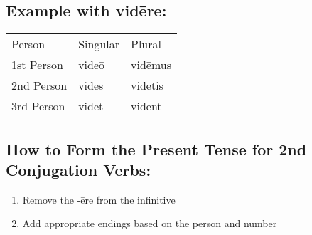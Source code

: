 \subsection*{Example with vidēre:}
\begin{tabular}{lll}
  Person & Singular & Plural \\ 
  1st Person & videō & vidēmus \\ 
  2nd Person & vidēs & vidētis \\ 
  3rd Person & videt & vident \\
\end{tabular}
\subsection*{How to Form the Present Tense for 2nd Conjugation Verbs:}
\begin{enumerate}
  \item Remove the -ēre from the infinitive 
  \item Add appropriate endings based on the person and number
\end{enumerate}
